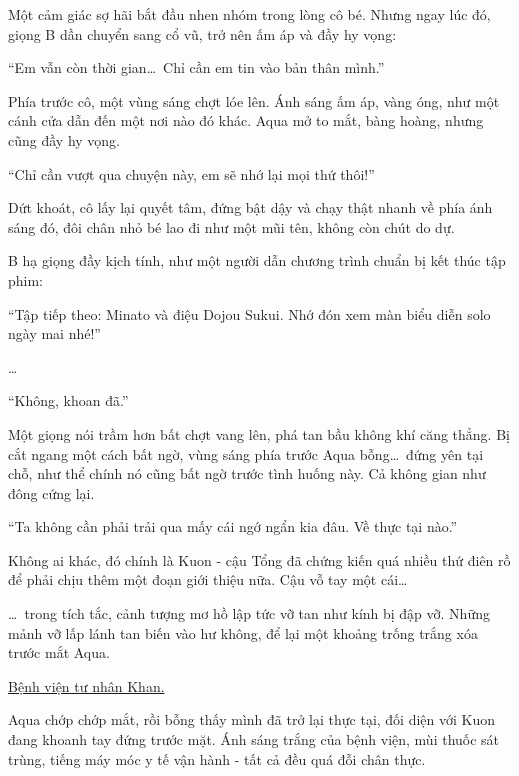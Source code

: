 \documentclass[../main.tex]{subfiles}
\begin{document}
Một cảm giác sợ hãi bắt đầu nhen nhóm trong lòng cô bé. Nhưng ngay lúc đó, giọng B dần chuyển sang cổ vũ, trở nên ấm áp và đầy hy vọng:

\begin{center}
  ``Em vẫn còn thời gian\dots\ Chỉ cần em tin vào bản thân mình.''
\end{center}

Phía trước cô, một vùng sáng chợt lóe lên. Ánh sáng ấm áp, vàng óng, như một cánh cửa dẫn đến một nơi nào đó khác. Aqua mở to mắt, bàng hoàng, nhưng cũng đầy hy vọng.

\begin{center}
  ``Chỉ cần vượt qua chuyện này, em sẽ nhớ lại mọi thứ thôi!''
\end{center}

Dứt khoát, cô lấy lại quyết tâm, đứng bật dậy và chạy thật nhanh về phía ánh sáng đó, đôi chân nhỏ bé lao đi như một mũi tên, không còn chút do dự.

B hạ giọng đầy kịch tính, như một người dẫn chương trình chuẩn bị kết thúc tập phim:

\begin{center}
  ``Tập tiếp theo: Minato và điệu Dojou Sukui. Nhớ đón xem màn biểu diễn solo ngày mai nhé!''
\end{center}

\dots

``Không, khoan đã.''

Một giọng nói trầm hơn bất chợt vang lên, phá tan bầu không khí căng thẳng. Bị cắt ngang một cách bất ngờ, vùng sáng phía trước Aqua bỗng\dots\ đứng yên tại chỗ, như thể chính nó cũng bất ngờ trước tình huống này. Cả không gian như đông cứng lại.

``Ta không cần phải trải qua mấy cái ngớ ngẩn kia đâu. Về thực tại nào.''

Không ai khác, đó chính là Kuon - cậu Tổng đã chứng kiến quá nhiều thứ điên rồ để phải chịu thêm một đoạn giới thiệu nữa. Cậu vỗ tay một cái\dots

\dots\ trong tích tắc, cảnh tượng mơ hồ lập tức vỡ tan như kính bị đập vỡ. Những mảnh vỡ lấp lánh tan biến vào hư không, để lại một khoảng trống trắng xóa trước mắt Aqua.

\begin{center}
  \uline{Bệnh viện tư nhân Khan.}
\end{center}

Aqua chớp chớp mắt, rồi bỗng thấy mình đã trở lại thực tại, đối diện với Kuon đang khoanh tay đứng trước mặt. Ánh sáng trắng của bệnh viện, mùi thuốc sát trùng, tiếng máy móc y tế vận hành - tất cả đều quá đỗi chân thực.
\end{document}
